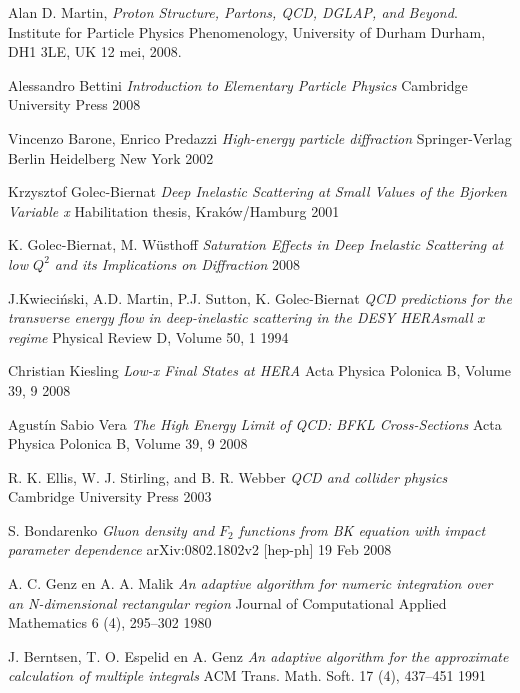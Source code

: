 \documentclass[a4paper,11pt]{article}
\numberwithin{equation}{section} %
\begin{document}
\newpage
\begin{thebibliography}{99}

  Alan D. Martin,
  \emph{Proton Structure, Partons, QCD, DGLAP, and Beyond}.
  Institute for Particle Physics Phenomenology,
  University of Durham
  Durham, DH1 3LE, UK
  12 mei, 2008.

  Alessandro Bettini
  \emph{Introduction to Elementary Particle Physics}
  Cambridge University Press
  2008

  Vincenzo Barone, Enrico Predazzi
  \emph{High-energy particle diffraction}
  Springer-Verlag Berlin Heidelberg New York
  2002

  Krzysztof Golec-Biernat
  \emph{Deep Inelastic Scattering at Small Values of the Bjorken Variable x}
  Habilitation thesis,
  Kraków/Hamburg
  2001

  K. Golec-Biernat, M. Wüsthoff
 \emph{Saturation Effects in Deep Inelastic Scattering at low $Q^2$ and its Implications on Diffraction}
  2008
  
  J.Kwieciński, A.D. Martin, P.J. Sutton, K. Golec-Biernat
  \emph{QCD predictions for the transverse energy flow in deep-inelastic scattering in the DESY HERAsmall $x$ regime}
  Physical Review D, Volume 50, 1
  1994

  Christian Kiesling
  \emph{Low-x Final States at HERA}
  Acta Physica Polonica B, Volume 39, 9
  2008

  Agustín Sabio Vera
  \emph{The High Energy Limit of QCD: BFKL Cross-Sections}
  Acta Physica Polonica B, Volume 39, 9
  2008

  R. K. Ellis, W. J. Stirling, and B. R. Webber
  \emph{QCD and collider physics}
  Cambridge University Press
  2003

  S. Bondarenko
  \emph{Gluon density and $F_2$ functions from BK equation with impact parameter dependence}
  arXiv:0802.1802v2 [hep-ph]
  19 Feb 2008

  A. C. Genz en A. A. Malik
  \emph{An adaptive algorithm for numeric integration over an N-dimensional rectangular region}
  Journal of Computational Applied Mathematics 6 (4), 295–302
  1980

  J. Berntsen, T. O. Espelid en A. Genz
  \emph{An adaptive algorithm for the approximate calculation of multiple integrals}
  ACM Trans. Math. Soft. 17 (4), 437–451
  1991


\end{thebibliography}
\end{document}
